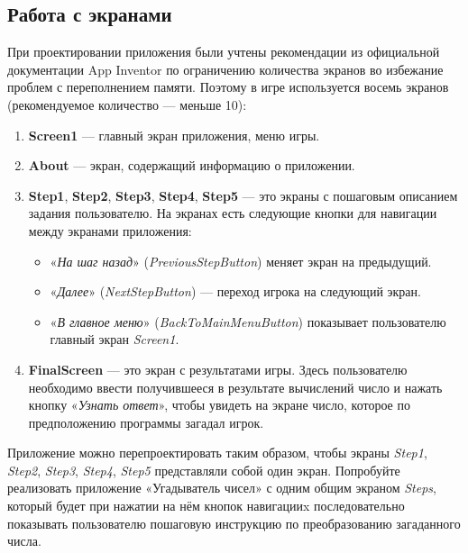 \subsection{Работа с экранами}
При проектировании приложения были учтены рекомендации из официальной документации App Inventor\cite{MitManyScreens} по ограничению количества экранов во избежание проблем с переполнением памяти.
Поэтому в игре используется восемь экранов (рекомендуемое количество — меньше 10):
\begin{enumerate}
\item \textbf{Screen1} — главный экран приложения, меню игры.
\item \textbf{About} — экран, содержащий информацию о приложении.
\item \textbf{Step1}, \textbf{Step2}, \textbf{Step3}, \textbf{Step4}, \textbf{Step5} — это экраны с пошаговым описанием задания пользователю. На экранах есть следующие кнопки для навигации между экранами приложения:
\begin{itemize}
  \item «\textit{На шаг назад}» (\textit{PreviousStepButton}) меняет экран на предыдущий.
  \item «\textit{Далее}» (\textit{NextStepButton}) — переход игрока на следующий экран.
  \item «\textit{В главное меню}» (\textit{BackToMainMenuButton}) показывает пользователю главный экран \textit{Screen1}.
\end{itemize}
\item \textbf{FinalScreen} — это экран с результатами игры. Здесь пользователю необходимо ввести получившееся в результате вычислений число и нажать кнопку «\textit{Узнать ответ}», чтобы увидеть на экране число, которое по предположению программы загадал игрок.
\end{enumerate}

\begin{mdfstyle}[nobreak=true,frametitle=Упражнение]
\sloppy Приложение можно перепроектировать таким образом, чтобы экраны \textit{Step1}, \textit{Step2}, \textit{Step3}, \textit{Step4}, \textit{Step5} представляли собой один экран. Попробуйте реализовать приложение «Угадыватель чисел» с одним общим экраном \textit{Steps}, который будет при нажатии на нём кнопок навигацииx последовательно показывать пользователю пошаговую инструкцию по преобразованию загаданного числа.\end{mdfstyle}


